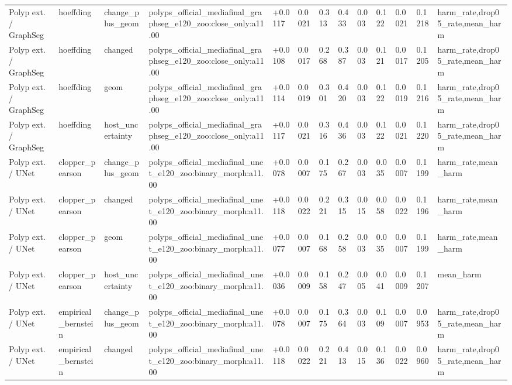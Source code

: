 \begin{table}[t]
\begin{tabular}{lllllllllllll}
Polyp ext. / GraphSeg & hoeffding & change\_plus\_geom & polyps\_official\_mediafinal\_graphseg\_e120\_zoo:close\_only:a11.00 & +0.0117 & 0.0021 & 0.313 & 0.433 & 0.003 & 0.122 & 0.0021 & 0.1218 & harm\_rate,drop05\_rate,mean\_harm \\
Polyp ext. / GraphSeg & hoeffding & changed & polyps\_official\_mediafinal\_graphseg\_e120\_zoo:close\_only:a11.00 & +0.0108 & 0.0017 & 0.268 & 0.387 & 0.003 & 0.121 & 0.0017 & 0.1205 & harm\_rate,drop05\_rate,mean\_harm \\
Polyp ext. / GraphSeg & hoeffding & geom & polyps\_official\_mediafinal\_graphseg\_e120\_zoo:close\_only:a11.00 & +0.0114 & 0.0019 & 0.301 & 0.420 & 0.003 & 0.122 & 0.0019 & 0.1216 & harm\_rate,drop05\_rate,mean\_harm \\
Polyp ext. / GraphSeg & hoeffding & host\_uncertainty & polyps\_official\_mediafinal\_graphseg\_e120\_zoo:close\_only:a11.00 & +0.0117 & 0.0021 & 0.316 & 0.436 & 0.003 & 0.122 & 0.0021 & 0.1220 & harm\_rate,drop05\_rate,mean\_harm \\
Polyp ext. / UNet & clopper\_pearson & change\_plus\_geom & polyps\_official\_mediafinal\_unet\_e120\_zoo:binary\_morph:a11.00 & +0.0078 & 0.0007 & 0.175 & 0.267 & 0.003 & 0.035 & 0.0007 & 0.1199 & harm\_rate,mean\_harm \\
Polyp ext. / UNet & clopper\_pearson & changed & polyps\_official\_mediafinal\_unet\_e120\_zoo:binary\_morph:a11.00 & +0.0118 & 0.0022 & 0.221 & 0.315 & 0.015 & 0.058 & 0.0022 & 0.1196 & harm\_rate,mean\_harm \\
Polyp ext. / UNet & clopper\_pearson & geom & polyps\_official\_mediafinal\_unet\_e120\_zoo:binary\_morph:a11.00 & +0.0077 & 0.0007 & 0.168 & 0.258 & 0.003 & 0.035 & 0.0007 & 0.1199 & harm\_rate,mean\_harm \\
Polyp ext. / UNet & clopper\_pearson & host\_uncertainty & polyps\_official\_mediafinal\_unet\_e120\_zoo:binary\_morph:a11.00 & +0.0036 & 0.0009 & 0.158 & 0.247 & 0.005 & 0.041 & 0.0009 & 0.1207 & mean\_harm \\
Polyp ext. / UNet & empirical\_bernstein & change\_plus\_geom & polyps\_official\_mediafinal\_unet\_e120\_zoo:binary\_morph:a11.00 & +0.0078 & 0.0007 & 0.175 & 0.364 & 0.003 & 0.109 & 0.0007 & 0.0953 & harm\_rate,drop05\_rate,mean\_harm \\
Polyp ext. / UNet & empirical\_bernstein & changed & polyps\_official\_mediafinal\_unet\_e120\_zoo:binary\_morph:a11.00 & +0.0118 & 0.0022 & 0.221 & 0.413 & 0.015 & 0.136 & 0.0022 & 0.0960 & harm\_rate,drop05\_rate,mean\_harm \\

\end{tabular}
\end{table}
